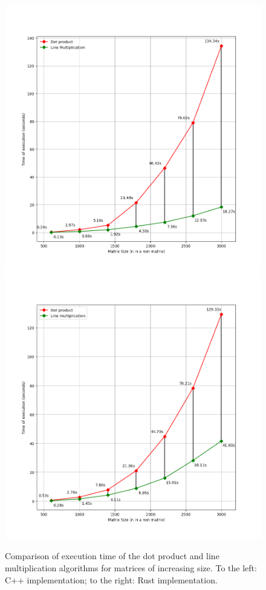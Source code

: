 \documentclass{report}
\begin{document}
				\begin{figure}[H]
					\begin{adjustbox}{center}
						\includegraphics[scale=0.4]{cpp_dot_line_comparison.png}
						\includegraphics[scale=0.4]{rs_algorithm_comparison.png}
					\end{adjustbox}
					\caption{Comparison of execution time of the dot product and line multiplication algorithms for matrices of increasing size. To the left: C++ implementation; to the right: Rust implementation.}
				\end{figure}
			
\end{document}
